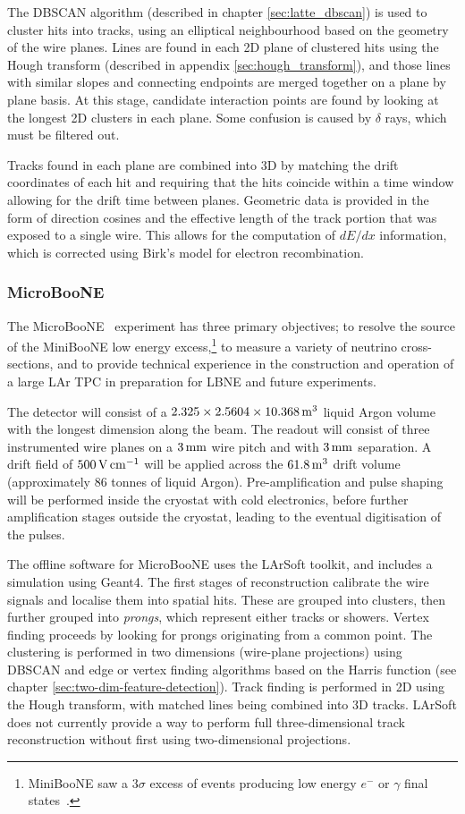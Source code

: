 The DBSCAN algorithm (described in chapter \ref{sec:latte_dbscan}) is used to cluster hits into tracks, using an elliptical neighbourhood based on the geometry of the wire planes. Lines are found in each 2D plane of clustered hits using the Hough transform (described in appendix \ref{sec:hough_transform}), and those lines with similar slopes and connecting endpoints are merged together on a plane by plane basis. At this stage, candidate interaction points are found by looking at the longest 2D clusters in each plane. Some confusion is caused by $\delta$ rays, which must be filtered out.

Tracks found in each plane are combined into 3D by matching the drift coordinates of each hit and requiring that the hits coincide within a time window allowing for the drift time between planes. Geometric data is provided in the form of direction cosines and the effective length of the track portion that was exposed to a single wire. This allows for the computation of $dE/dx$ information, which is corrected using Birk's model for electron recombination.

\subsubsection{MicroBooNE}
The MicroBooNE~\citep{MicroBooNE} experiment has three primary objectives; to resolve the source of the MiniBooNE low energy excess,\footnote{MiniBooNE saw a $3\sigma$ excess of events producing low energy $e^-$ or $\gamma$ final states~\citep{MiniBooNE}.} to measure a variety of neutrino cross-sections, and to provide technical experience in the construction and operation of a large \acs{LAr TPC} in preparation for LBNE and future experiments.

The detector will consist of a $2.325\times 2.5604 \times 10.368 \metre^3$ liquid Argon volume with the longest dimension along the beam. The readout will consist of three instrumented wire planes on a $3\mm$ wire pitch and with $3\mm$ separation. A drift field of $500\volt\cm^{-1}$ will be applied across the $61.8\metre^3$ drift volume (approximately $86$ tonnes of liquid Argon). Pre-amplification and pulse shaping will be performed inside the cryostat with cold electronics, before further amplification stages outside the cryostat, leading to the eventual digitisation of the pulses.

The offline software for MicroBooNE uses the LArSoft toolkit, and includes a simulation using Geant4. The first stages of reconstruction calibrate the wire signals and localise them into spatial hits. These are grouped into clusters, then further grouped into \emph{prongs}, which represent either tracks or showers. Vertex finding proceeds by looking for prongs originating from a common point. The clustering is performed in two dimensions (wire-plane projections) using DBSCAN and edge or vertex finding algorithms based on the Harris function (see chapter \ref{sec:two-dim-feature-detection}). Track finding is performed in 2D using the Hough transform, with matched lines being combined into 3D tracks. LArSoft does not currently provide a way to perform full three-dimensional track reconstruction without first using two-dimensional projections.

